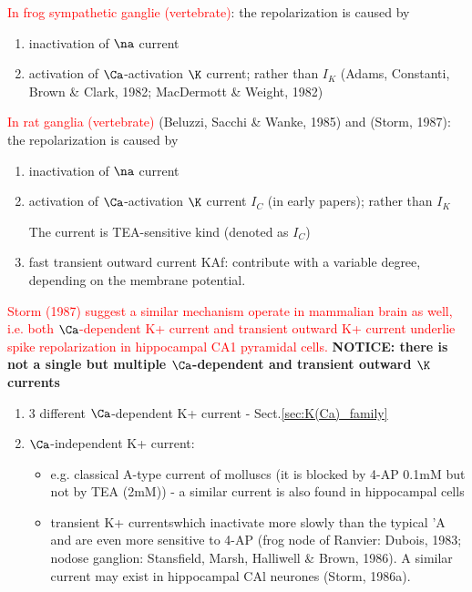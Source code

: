 \textcolor{red}{In frog sympathetic ganglie (vertebrate)}: the
repolarization is caused by
\begin{enumerate}
  \item inactivation of $\na$ current
  \item activation of $\Ca$-activation $\K$ current; rather than $I_K$ 
  (Adams, Constanti, Brown \& Clark, 1982; MacDermott \& Weight, 1982)
\end{enumerate}

\textcolor{red}{In rat ganglia (vertebrate)} (Beluzzi, Sacchi \& Wanke, 1985)
and  (Storm, 1987):
the repolarization is caused by
\begin{enumerate}
  \item inactivation of $\na$ current
  \item activation of $\Ca$-activation $\K$ current $I_C$ (in early papers);
  rather than $I_K$
  
  The current is TEA-sensitive kind (denoted as $I_C$)
  
  \item fast transient outward current KAf:
  contribute with a variable degree, depending on the membrane potential.
  
\end{enumerate}
\textcolor{red}{Storm (1987) suggest a similar mechanism operate in mammalian
brain as well, i.e. both $\Ca$-dependent K+ current and transient outward K+
current underlie spike repolarization in hippocampal CA1 pyramidal cells.}
{\bf NOTICE: there is not a single but multiple $\Ca$-dependent and transient
outward $\K$ currents}
\begin{enumerate}
  \item 3 different $\Ca$-dependent K+ current - Sect.\ref{sec:K(Ca)_family}
  
  \item $\Ca$-independent K+ current: 
  \begin{itemize}
    \item  e.g. classical A-type current of molluscs
  (it is blocked by 4-AP 0.1mM but not by TEA (2mM)) - a similar current is also
  found in hippocampal cells
  
    \item transient K+ currentswhich inactivate more slowly than the typical 'A
    and are even more sensitive to 4-AP (frog node of Ranvier: Dubois, 1983;
    nodose ganglion: Stansfield, Marsh, Halliwell \& Brown, 1986).
    A similar current may exist in hippocampal CAl neurones (Storm, 1986a).

    
  \end{itemize}
  
\end{enumerate}


